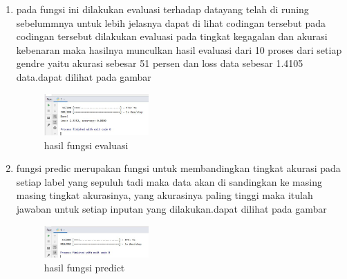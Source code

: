 \begin{enumerate}
        \item  pada fungsi ini dilakukan evaluasi terhadap datayang telah di runing sebelummnya untuk lebih jelasnya dapat di lihat codingan tersebut  pada codingan tersebut dilakukan evaluasi pada tingkat kegagalan dan akurasi kebenaran maka hasilnya munculkan hasil evaluasi dari 10 proses dari setiap gendre yaitu akurasi sebesar 51 persen dan loss data sebesar 1.4105 data.dapat dilihat pada gambar 
        \begin{figure}[H]
            \includegraphics[width=4cm]{figures/1174039/chapter6/10.jpg}
            \centering
            \caption{hasil fungsi evaluasi}
        \end{figure}
        
        \item  fungsi predic merupakan fungsi untuk membandingkan tingkat akurasi pada setiap label yang sepuluh tadi maka data akan di sandingkan ke masing masing tingkat akurasinya, yang akurasinya paling tinggi maka itulah jawaban untuk setiap inputan yang dilakukan.dapat dilihat pada gambar
        \begin{figure}[H]
            \includegraphics[width=4cm]{figures/1174039/chapter6/11.jpg}
            \centering
            \caption{hasil fungsi predict}
        \end{figure}

        \end{enumerate}